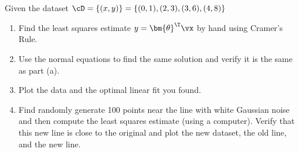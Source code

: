 \documentclass[189]{pset}
\begin{document}

  \section{}
    Given the dataset $\cD = \{(x,y)\} = \{(0,1), (2,3), (3,6), (4,8)\}$
    \begin{enumerate}
      \item Find the least squares estimate $y = {\bm{\theta}}^\T\vx$ by
        hand using Cramer's Rule.
      \item Use the normal equations to find the same solution and
        verify it is the same as part (a).
      \item Plot the data and the optimal linear fit you found.
      \item Find randomly generate 100 points near the line with white
        Gaussian noise and then compute the least squares estimate
        (using a computer). Verify that this new line is close to the
        original and plot the new dataset, the old line, and the new
        line.
    \end{enumerate}

  \hrulefill
\end{document}
